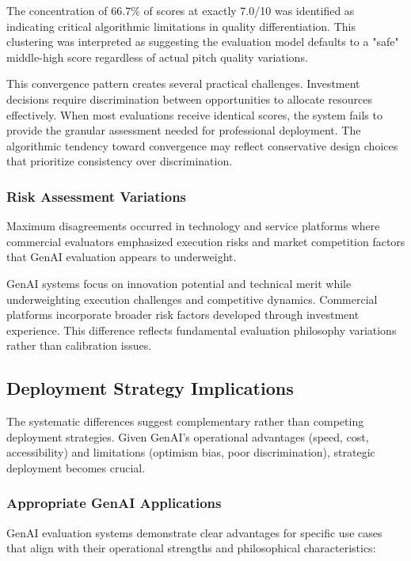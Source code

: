 The concentration of 66.7\% of scores at exactly 7.0/10 was identified as indicating critical algorithmic limitations in quality differentiation. This clustering was interpreted as suggesting the evaluation model defaults to a "safe" middle-high score regardless of actual pitch quality variations.

This convergence pattern creates several practical challenges. Investment decisions require discrimination between opportunities to allocate resources effectively. When most evaluations receive identical scores, the system fails to provide the granular assessment needed for professional deployment. The algorithmic tendency toward convergence may reflect conservative design choices that prioritize consistency over discrimination.

\subsubsection{Risk Assessment Variations}
\label{subsec:risk}

Maximum disagreements occurred in technology and service platforms where commercial evaluators emphasized execution risks and market competition factors that GenAI evaluation appears to underweight.

GenAI systems focus on innovation potential and technical merit while underweighting execution challenges and competitive dynamics. Commercial platforms incorporate broader risk factors developed through investment experience. This difference reflects fundamental evaluation philosophy variations rather than calibration issues.

\subsection{Deployment Strategy Implications}
\label{sec:deployment}

The systematic differences suggest complementary rather than competing deployment strategies. Given GenAI's operational advantages (speed, cost, accessibility) and limitations (optimism bias, poor discrimination), strategic deployment becomes crucial.

\subsubsection{Appropriate GenAI Applications}
\label{subsec:ai-applications}

GenAI evaluation systems demonstrate clear advantages for specific use cases that align with their operational strengths and philosophical characteristics:

